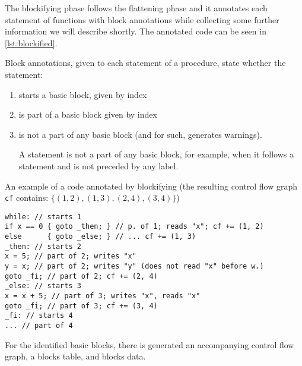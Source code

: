 The blockifying phase follows the flattening phase and it annotates each statement of functions with block annotations while collecting some further information we will describe shortly. The annotated code can be seen in \cref{lst:blockified}.

\begin{defn}
    Block annotations, given to each statement of a procedure, state whether the statement:

    \begin{enumerate}
        \item starts a basic block, given by index
        \item is part of a basic block given by index
        \item is not a part of any basic block (and for such, generates warnings).

        A statement is not a part of any basic block, for example, when it follows a  statement and is not preceded by any label.
    \end{enumerate}
\end{defn}

\begin{codex}
    \caption{An example of a code annotated by blockifying (the resulting control flow graph \texttt{cf} contains: $\{(1,2), (1,3), (2,4), (3,4)\}$)}
    \label{lst:blockified}
    \begin{lstlisting}
while: // starts 1
if x == 0 { goto _then; } // p. of 1; reads "x"; cf += (1, 2)
else      { goto _else; } // ... cf += (1, 3)
_then: // starts 2
x = 5; // part of 2; writes "x"
y = x; // part of 2; writes "y" (does not read "x" before w.)
goto _fi; // part of 2; cf += (2, 4)
_else: // starts 3
x = x + 5; // part of 3; writes "x", reads "x"
goto _fi; // part of 3; cf += (3, 4)
_fi: // starts 4
... // part of 4
    \end{lstlisting}
\end{codex}

For the identified basic blocks, there is generated an accompanying control flow graph, a blocks table, and blocks data.

